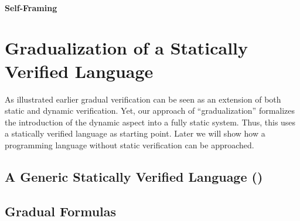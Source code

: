 \subsubsection{Self-Framing}





\chapter{Gradualization of a Statically Verified Language}

As illustrated earlier %
gradual verification can be seen as an extension of both static and dynamic verification.
Yet, our approach of “gradualization” formalizes the introduction of the dynamic aspect into a fully static system.
Thus, this %
uses a statically verified language as starting point.
Later %
we will show how a programming language without static verification can be approached.



\section{A Generic Statically Verified Language (\gsvl)}
\label{sec:a-statically-verified}


\section{Gradual Formulas}
\label{sec:gradual-formulas}


